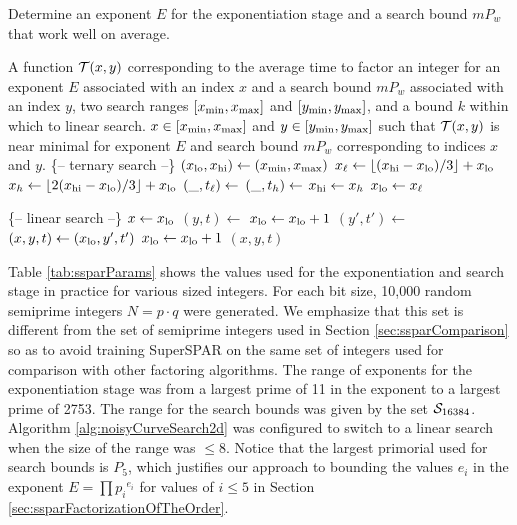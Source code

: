 \documentclass{ucalgthes1}
\theoremstyle{definition}
\newcommand{\floor}[1]{\left\lfloor #1 \right\rfloor}
\begin{document}
\begin{algorithm}[htb]
\caption[2-Dimensional Ternary Search of a Noisy Surface.]{Determine an exponent $E$ for the exponentiation stage and a search bound $mP_w$ that work well on average.}
\label{alg:noisyCurveSearch2d}
\begin{algorithmic}[1]
\Require A function $\mathcal T(x, y)$ corresponding to the average time to factor an integer for an exponent $E$ associated with an index $x$ and a search bound $mP_w$ associated with an index $y$,
two search ranges $[x_{\textrm{min}}, x_{\textrm{max}}]$ and $[y_{\textrm{min}}, y_{\textrm{max}}]$,
and a bound $k$ within which to linear search.
\Ensure $x \in [x_{\textrm{min}}, x_{\textrm{max}}]$ and $y \in [y_{\textrm{min}}, y_{\textrm{max}}]$ such that $\mathcal T(x, y)$ is near minimal for exponent $E$ and search bound $mP_w$ corresponding to indices $x$ and $y$.
\Statex \{-- ternary search --\}
\State $(x_{\textrm{lo}}, x_{\textrm{hi}}) \gets (x_{\textrm{min}}, x_{\textrm{max}})$
	\State $\xonethird \gets \floor{(\xhi - \xlo) / 3} + \xlo$
	\State $\xtwothird \gets \floor{2(\xhi - \xlo) / 3} + \xlo$
	\State $(\_, t_\ell) \gets$ 
	\State $(\_, t_h) \gets$ 
	\If{$\tonethird \le \ttwothird$}
		\State $x_{\textrm{hi}} \gets x_h$
	\Else
		\State $x_{\textrm{lo}} \gets x_\ell$
	\EndIf
\EndWhile

\Statex \{-- linear search --\}
\State $x \gets x_{\textrm{lo}}$ 
\State $(y, t) \gets$ 
\State $x_{\textrm{lo}} \gets x_{\textrm{lo}} + 1$
\While{$\xlo \le \xhi$}
	\State $(y', t') \gets$ 
	 $(x, y, t) \gets (x_{\textrm{lo}}, y', t')$ \EndIf
	\State $x_{\textrm{lo}} \gets x_{\textrm{lo}} + 1$
\EndWhile
\State \Return $(x, y, t)$
\EndProcedure
\end{algorithmic}
\end{algorithm}

Table \ref{tab:ssparParams} shows the values used for the exponentiation and search stage in practice for various sized integers. For each bit size, 10,000 random semiprime integers $N = p \cdot q$ were generated.  We emphasize that this set is different from the set of semiprime integers used in Section \ref{sec:ssparComparison} so as to avoid training SuperSPAR on the same set of integers used for comparison with other factoring algorithms.  The range of exponents for the exponentiation stage was from a largest prime of 11 in the exponent to a largest prime of 2753.  The range for the search bounds was given by the set $\mathcal S_{16384}$.  Algorithm \ref{alg:noisyCurveSearch2d} was configured to switch to a linear search when the size of the range was $\le 8$.  Notice that the largest primorial used for search bounds is $P_5$, which justifies our approach to bounding the values $e_i$ in the exponent $E = \prod {p_i}^{e_i}$ for values of $i \le 5$ in Section \ref{sec:ssparFactorizationOfTheOrder}.
\end{document}
